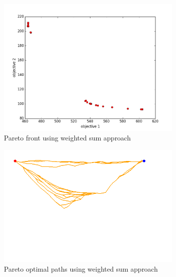 \documentclass[conference]{IEEEtran}
\begin{document}
\begin{figure}
\begin{subfigure}[b]{0.45\linewidth}
		\includegraphics[width=\textwidth]{fig/sim4-obstacle/PF04-MORRT.png}
		\caption{Pareto front using weighted sum approach}
		\label{fig:sim:obs:pf:a}
	\end{subfigure}
	\begin{subfigure}[b]{0.45\linewidth}
		\centering
		\includegraphics[width=\textwidth]{fig/sim4-obstacle/MORRTstar01-1-ALL.png}
		\caption{Pareto optimal paths using weighted sum approach}
		\label{fig:sim:obs:sols:a}
	\end{subfigure}  \\
	\begin{subfigure}[b]{0.45\linewidth}
		\centering

\end{subfigure}
\end{figure}
\end{document}
